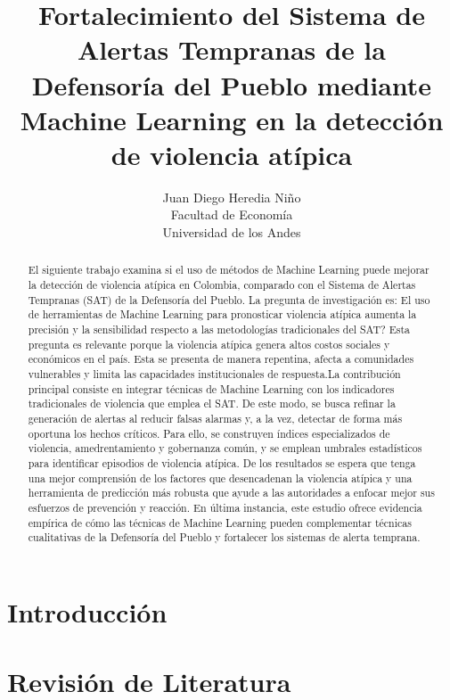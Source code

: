 \documentclass[12pt]{article}
\title{Fortalecimiento del Sistema de Alertas Tempranas de la Defensoría del Pueblo mediante Machine Learning en la detección de violencia atípica}
\author{Juan Diego Heredia Niño \\
Facultad de Economía \\
Universidad de los Andes}
\begin{document}
\maketitle

\begin{abstract}
El siguiente trabajo examina si el uso de métodos de Machine Learning puede mejorar la detección de violencia atípica en Colombia, comparado con el Sistema de Alertas Tempranas (SAT) de la Defensoría del Pueblo. La pregunta de investigación es: \¿El uso de herramientas de Machine Learning para pronosticar violencia atípica aumenta la precisión y la sensibilidad respecto a las metodologías tradicionales del SAT? Esta pregunta es relevante porque la violencia atípica genera altos costos sociales y económicos en el país. Esta se presenta de manera repentina, afecta a comunidades vulnerables y limita las capacidades institucionales de respuesta.La contribución principal consiste en integrar técnicas de Machine Learning con los indicadores tradicionales de violencia que emplea el SAT. De este modo, se busca refinar la generación de alertas al reducir falsas alarmas y, a la vez, detectar de forma más oportuna los hechos críticos. Para ello, se construyen índices especializados de violencia, amedrentamiento y gobernanza común, y se emplean umbrales estadísticos para identificar episodios de violencia atípica. De los resultados se espera que tenga una mejor comprensión de los factores que desencadenan la violencia atípica y una herramienta de predicción más robusta que ayude a las autoridades a enfocar mejor sus esfuerzos de prevención y reacción. En última instancia, este estudio ofrece evidencia empírica de cómo las técnicas de Machine Learning pueden complementar técnicas cualitativas de la Defensoría del Pueblo y fortalecer los sistemas de alerta temprana.

\end{abstract}
\newpage
\section{Introducción}



\section{Revisión de Literatura}


\end{document}
